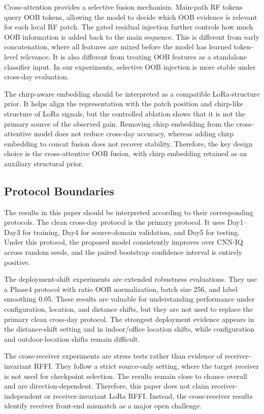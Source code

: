 Cross-attention provides a selective fusion mechanism. Main-path RF tokens query OOB tokens, allowing the model to decide which OOB evidence is relevant for each local RF patch. The gated residual injection further controls how much OOB information is added back to the main sequence. This is different from early concatenation, where all features are mixed before the model has learned token-level relevance. It is also different from treating OOB features as a standalone classifier input. In our experiments, selective OOB injection is more stable under cross-day evaluation.

The chirp-aware embedding should be interpreted as a compatible LoRa-structure prior. It helps align the representation with the patch position and chirp-like structure of LoRa signals, but the controlled ablation shows that it is not the primary source of the observed gain. Removing chirp embedding from the cross-attentive model does not reduce cross-day accuracy, whereas adding chirp embedding to concat fusion does not recover stability. Therefore, the key design choice is the cross-attentive OOB fusion, with chirp embedding retained as an auxiliary structural prior.

\subsection{Protocol Boundaries}

The results in this paper should be interpreted according to their corresponding protocols. The clean cross-day protocol is the primary protocol. It uses Day1--Day3 for training, Day4 for source-domain validation, and Day5 for testing. Under this protocol, the proposed model consistently improves over CNN-IQ across random seeds, and the paired bootstrap confidence interval is entirely positive.

The deployment-shift experiments are extended robustness evaluations. They use a Phase4 protocol with ratio OOB normalization, batch size 256, and label smoothing 0.05. These results are valuable for understanding performance under configuration, location, and distance shifts, but they are not used to replace the primary clean cross-day protocol. The strongest deployment evidence appears in the distance-shift setting and in indoor/office location shifts, while configuration and outdoor-location shifts remain difficult.

The cross-receiver experiments are stress tests rather than evidence of receiver-invariant RFFI. They follow a strict source-only setting, where the target receiver is not used for checkpoint selection. The results remain close to chance overall and are direction-dependent. Therefore, this paper does not claim receiver-independent or receiver-invariant LoRa RFFI. Instead, the cross-receiver results identify receiver front-end mismatch as a major open challenge.

